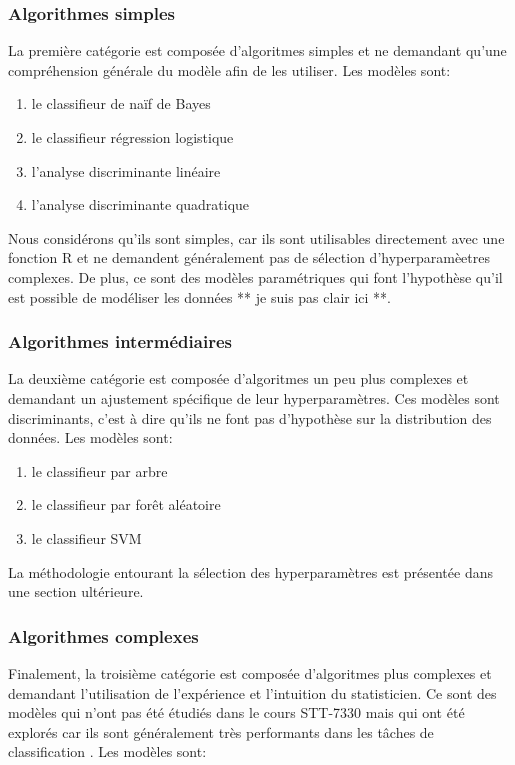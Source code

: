\subsubsection{Algorithmes simples}
La première catégorie est composée d'algoritmes simples et ne demandant qu'une compréhension générale du modèle afin de les utiliser. Les modèles sont:

\begin{enumerate}
  \item le classifieur de naïf de Bayes
  \item le classifieur régression logistique
  \item l'analyse discriminante linéaire
  \item l'analyse discriminante quadratique 
\end{enumerate}

Nous considérons qu'ils sont simples, car ils sont utilisables directement avec une fonction R et ne demandent généralement pas de sélection d'hyperparamèetres complexes. De plus, ce sont des modèles paramétriques qui font l'hypothèse qu'il est possible de modéliser les données ** je suis pas clair ici **. 

\subsubsection{Algorithmes intermédiaires}
La deuxième catégorie est composée d'algoritmes un peu plus complexes et demandant un ajustement spécifique de leur hyperparamètres. Ces modèles sont discriminants, c'est à dire qu'ils ne font pas d'hypothèse sur la distribution des données. Les modèles sont:

\begin{enumerate}
  \item le classifieur par arbre \cite{packagerpart}
  \item le classifieur par forêt aléatoire
  \item le classifieur SVM 
\end{enumerate}

La méthodologie entourant la sélection des hyperparamètres est présentée dans une section ultérieure.

\subsubsection{Algorithmes complexes}
Finalement, la troisième catégorie est composée d'algoritmes plus complexes et demandant l'utilisation de l'expérience et l'intuition du statisticien. Ce sont des modèles qui n'ont pas été étudiés dans le cours STT-7330 mais qui ont été explorés car ils sont généralement très performants dans les tâches de classification . Les modèles sont:

